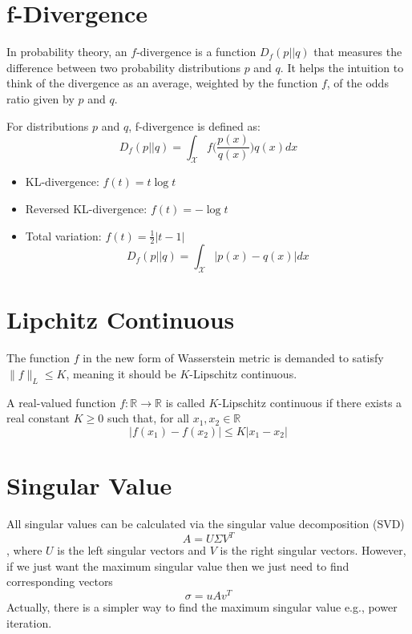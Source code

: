 \begin{appendices}
\section{f-Divergence}
In probability theory, an $f$-divergence is a function $D_{f}(p||q)$ that measures the difference between two probability distributions $p$ and $q$. It helps the intuition to think of the divergence as an average, weighted by the function $f$, of the odds ratio given by $p$ and $q$.

For distributions $p$ and $q$, f-divergence is defined as:
$$D_{f}(p||q) = \int_{\mathcal{X}}f\Bigg(\frac{p(x)}{q(x)}\Bigg)q(x)dx$$

\begin{itemize}
	\item KL-divergence: $f(t) = t\log t$
	\item Reversed KL-divergence: $f(t) = -\log t$
	\item Total variation: $f(t) = \frac{1}{2}|t-1|$
	$$D_{f}(p||q) = \int_{\mathcal{X}}|p(x)-q(x)|dx$$
\end{itemize}

\section{Lipchitz Continuous}
The function $f$ in the new form of Wasserstein metric is demanded to satisfy $\| f \|_L \leq K$, meaning it should be $K$-Lipschitz continuous.

A real-valued function $f: \mathbb{R} \rightarrow \mathbb{R}$ is called $K$-Lipschitz continuous if there exists a real constant $K\geq 0$ such that, for all $x_1, x_2 \in \mathbb{R}$
$$\lvert f(x_1) - f(x_2) \rvert \leq K \lvert x_1 - x_2 \rvert$$

\section{Singular Value}
All singular values can be calculated via the singular value decomposition (SVD)
$$A = U\Sigma V^T$$
, where $U$ is the left singular vectors and $V$ is the right singular vectors. However, if we just want the maximum singular value then we just need to find corresponding vectors
$$\sigma = uAv^T$$
Actually, there is a simpler way to find the maximum singular value e.g., power iteration. 



\end{appendices}
